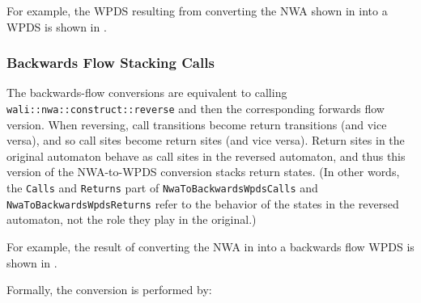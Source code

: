 For example, the WPDS resulting from converting the NWA
shown in  into a WPDS is shown in
. \\


\subsubsection{Backwards Flow Stacking Calls}

The backwards-flow conversions are equivalent to calling
\texttt{wali::\-nwa::\-construct::\-reverse} and then the corresponding forwards
flow version. When reversing, call transitions become return transitions (and
vice versa), and so call sites become return sites (and vice versa).
Return sites in the original automaton behave as call sites in the reversed
automaton, and thus this version of the NWA-to-WPDS conversion stacks return
states. (In
other words, the \texttt{Calls} and \texttt{Returns} part of
\texttt{NwaTo\-Backwards\-WpdsCalls} and
\texttt{NwaTo\-Backwards\-WpdsReturns} refer to the behavior of the states in
the reversed automaton, not the role they play in the original.)

For example, the result of converting the NWA in
 into a backwards flow WPDS is shown in .


Formally, the conversion is performed by:


